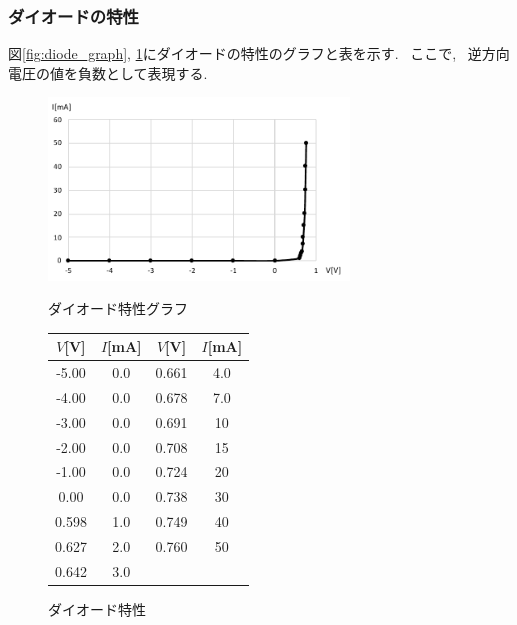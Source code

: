 \documentclass[uplatex,dvipdfmx,a4paper,js=standard, titlepage]{bxjsarticle}
\begin{document}
        \subsubsection{ダイオードの特性}
            図\ref{fig:diode_graph}, \ref{tab:diode_table}にダイオードの特性のグラフと表を示す.
            ~ここで, ~逆方向電圧の値を負数として表現する.
            \begin{figure}[ht]
                \begin{minipage}{0.5\hsize}
                    \begin{center}
                        \includegraphics[width=8cm]{graphs/diode_graph.pdf}
                        \caption{ダイオード特性グラフ}
                        \label{fig:diode_graph}
                    \end{center}
                \end{minipage}
                \def\@captype{table}
                \begin{minipage}{0.5\hsize}
                    \begin{center}
                        \caption{ダイオード特性}
                        \label{tab:diode_table}
                        \begin{tabular}{c|c||c|c}
                            $V$[V] & $I$[mA] & $V$[V] & $I$[mA] \\ \hline \hline
                            -5.00 & 0.0 & 0.661 & 4.0 \\
                            -4.00 & 0.0 & 0.678 & 7.0 \\
                            -3.00 & 0.0 & 0.691 & 10 \\
                            -2.00 & 0.0 & 0.708 & 15 \\
                            -1.00 & 0.0 & 0.724 & 20 \\
                            0.00 & 0.0 & 0.738 & 30 \\
                            0.598 & 1.0 & 0.749 & 40 \\
                            0.627 & 2.0 & 0.760 & 50 \\
                            0.642 & 3.0 & \\
                        \end{tabular}
                    \end{center}
                \end{minipage}
            \end{figure}
\end{document}
